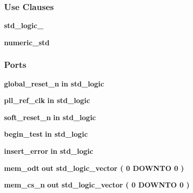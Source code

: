 \subsubsection*{Use Clauses}
 \begin{DoxyCompactItemize}
\item 
{\bf std\+\_\+logic\+\_}   
\item 
{\bf numeric\+\_\+std}   
\end{DoxyCompactItemize}
\subsubsection*{Ports}
 \begin{DoxyCompactItemize}
\item 
{\bf global\+\_\+reset\+\_\+n}  {\bfseries {\bfseries \textcolor{keywordflow}{in}\textcolor{vhdlchar}{ }}} {\bfseries \textcolor{comment}{std\+\_\+logic}\textcolor{vhdlchar}{ }} 
\item 
{\bf pll\+\_\+ref\+\_\+clk}  {\bfseries {\bfseries \textcolor{keywordflow}{in}\textcolor{vhdlchar}{ }}} {\bfseries \textcolor{comment}{std\+\_\+logic}\textcolor{vhdlchar}{ }} 
\item 
{\bf soft\+\_\+reset\+\_\+n}  {\bfseries {\bfseries \textcolor{keywordflow}{in}\textcolor{vhdlchar}{ }}} {\bfseries \textcolor{comment}{std\+\_\+logic}\textcolor{vhdlchar}{ }} 
\item 
{\bf begin\+\_\+test}  {\bfseries {\bfseries \textcolor{keywordflow}{in}\textcolor{vhdlchar}{ }}} {\bfseries \textcolor{comment}{std\+\_\+logic}\textcolor{vhdlchar}{ }} 
\item 
{\bf insert\+\_\+error}  {\bfseries {\bfseries \textcolor{keywordflow}{in}\textcolor{vhdlchar}{ }}} {\bfseries \textcolor{comment}{std\+\_\+logic}\textcolor{vhdlchar}{ }} 
\item 
{\bf mem\+\_\+odt}  {\bfseries {\bfseries \textcolor{keywordflow}{out}\textcolor{vhdlchar}{ }}} {\bfseries \textcolor{comment}{std\+\_\+logic\+\_\+vector}\textcolor{vhdlchar}{ }\textcolor{vhdlchar}{(}\textcolor{vhdlchar}{ }\textcolor{vhdlchar}{ } \textcolor{vhdldigit}{0} \textcolor{vhdlchar}{ }\textcolor{keywordflow}{D\+O\+W\+N\+TO}\textcolor{vhdlchar}{ }\textcolor{vhdlchar}{ } \textcolor{vhdldigit}{0} \textcolor{vhdlchar}{ }\textcolor{vhdlchar}{)}\textcolor{vhdlchar}{ }} 
\item 
{\bf mem\+\_\+cs\+\_\+n}  {\bfseries {\bfseries \textcolor{keywordflow}{out}\textcolor{vhdlchar}{ }}} {\bfseries \textcolor{comment}{std\+\_\+logic\+\_\+vector}\textcolor{vhdlchar}{ }\textcolor{vhdlchar}{(}\textcolor{vhdlchar}{ }\textcolor{vhdlchar}{ } \textcolor{vhdldigit}{0} \textcolor{vhdlchar}{ }\textcolor{keywordflow}{D\+O\+W\+N\+TO}\textcolor{vhdlchar}{ }\textcolor{vhdlchar}{ } \textcolor{vhdldigit}{0} \textcolor{vhdlchar}{ }\textcolor{vhdlchar}{)}\textcolor{vhdlchar}{ }} 

\end{DoxyCompactItemize}
